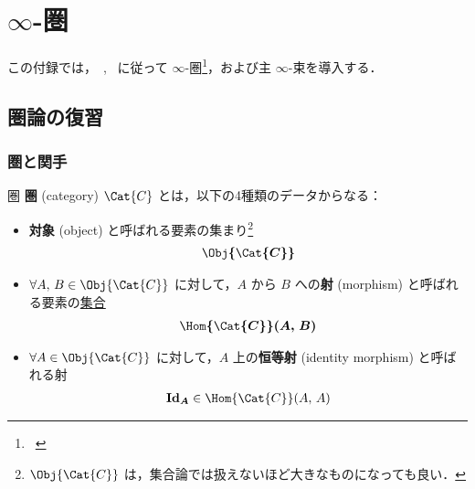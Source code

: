 \documentclass[TQFT_main]{subfiles}
\begin{document}
\chapter{$\infty$-圏}

この付録では，~\cite{Land2021infinity}, ~\cite{alfonsi2023higher}に従って $\infty$-圏\footnote{~\cite{lurie2008higher}}，および主 $\infty$-束を導入する．

\section{圏論の復習}

\subsection{圏と関手}

\begin{mydef}[label=def:category, breakable]{圏}
	\textbf{圏} (category) $\Cat{C}$ とは，以下の4種類のデータからなる：
	\begin{itemize}
		\item \textbf{対象} (object) と呼ばれる要素の集まり\footnote{$\Obj{\Cat{C}}$ は，集合論では扱えないほど大きなものになっても良い．}
		\begin{align}
			\bm{\Obj{\Cat{C}}}
		\end{align}
		
		\item $\forall A,\, B \in \Obj{\Cat{C}}$ に対して，$A$ から $B$ への\textbf{射} (morphism) と呼ばれる要素の\underline{集合}
		\begin{align}
			\bm{\Hom{\Cat{C}}(A,\, B)}
		\end{align}
		
		\item $\forall A \in \Obj{\Cat{C}}$ に対して，$A$ 上の\textbf{恒等射} (identity morphism) と呼ばれる射
		\begin{align}
			\bm{\mathrm{Id}_A} \in \Hom{\Cat{C}}(A,\, A)
		\end{align}
		

\end{itemize}
\end{mydef}
\end{document}
